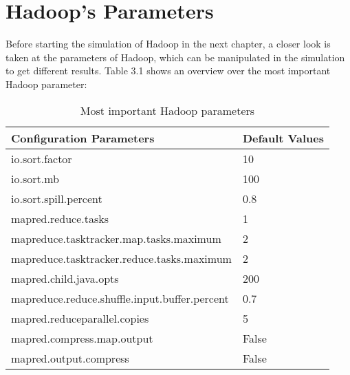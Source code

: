 \chapter{Hadoop's Parameters}
\label{params}
Before starting the simulation of Hadoop in the next chapter, a closer look is taken at the parameters of Hadoop, which can be manipulated in the simulation to get different results. Table 3.1 shows an overview over the most important Hadoop parameter:
\begin{table}[H]
	\centering
	\label{parameters}
	\begin{tabular}{|l|l|}
		\hline
		\textbf{Configuration Parameters}             & \textbf{Default Values} \\ \hline
		io.sort.factor                                & 10                      \\ \hline
		io.sort.mb                                    & 100                     \\ \hline
		io.sort.spill.percent                         & 0.8                     \\ \hline
		mapred.reduce.tasks                           & 1                       \\ \hline
		mapreduce.tasktracker.map.tasks.maximum       & 2                       \\ \hline
		mapreduce.tasktracker.reduce.tasks.maximum    & 2                       \\ \hline
		mapred.child.java.opts                        & 200                     \\ \hline
		mapreduce.reduce.shuffle.input.buffer.percent & 0.7                     \\ \hline
		mapred.reduceparallel.copies                  & 5                       \\ \hline
		mapred.compress.map.output                    & False                   \\ \hline
		mapred.output.compress                        & False                   \\ \hline
	\end{tabular}
	\caption{Most important Hadoop parameters}
\end{table}

